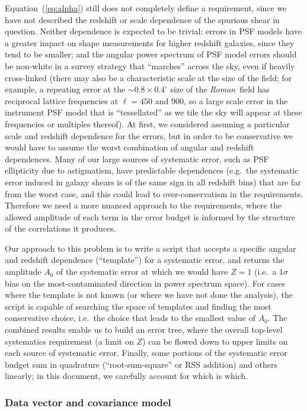 \documentclass[usenatbib]{mnras}
\newcommand{\wfirst}{{\slshape Roman}}
\begin{document}
Equation~(\ref{eq:alpha}) still does not completely define a
requirement, since we have not described the redshift or scale
dependence of the spurious shear in question. Neither dependence is
expected to be trivial: errors in PSF models have a greater impact on
shape measurements for higher redshift galaxies, since they tend to be
smaller; and the angular power spectrum of PSF model errors should be
non-white in a survey strategy that ``marches'' across the sky, even
if heavily cross-linked (there may also be a characteristic scale at
the size of the field; for example, a repeating error at the $\sim
0.8\times0.4^\circ$ size of the \wfirst\ field has reciprocal lattice
frequencies at $\ell = 450$ and 900, so a large scale error in the
instrument PSF model that is ``tessellated'' as we tile the sky will
appear at these frequencies or multiples thereof). At first, we
considered assuming a particular scale and redshift dependence for the
errors, but in order to be conservative we would have to assume the
worst combination of angular and redshift dependences. Many of our
large sources of systematic error, such as PSF ellipticity due to
astigmatism, have predictable dependences (e.g.\ the systematic error
induced in galaxy shears is of the same sign in all redshift bins)
that are far from the worst case, and this could lead to
over-conservatism in the requirements. Therefore we need a more
nuanced approach to the requirements, where the allowed amplitude of
each term in the error budget is informed by the structure of the
correlations it produces.

Our approach to this problem is to write a script that accepts a
specific angular and redshift dependence (``template'') for a
systematic error, and returns the amplitude $A_0$ of the systematic
error at which we would have $Z=1$ (i.e.\ a $1\sigma$ bias on the
most-contaminated direction in power spectrum space). For cases where
the template is not known (or where we have not done the analysis),
the script is capable of searching the space of templates and finding
the most conservative choice, i.e.\ the choice that leads to the
smallest value of $A_0$. The combined results enable us to build an
error tree, where the overall top-level systematics requirement (a
limit on $Z$) can be flowed down to upper limits on each source of
systematic error. Finally, some portions of the systematic error
budget sum in quadrature (``root-sum-square'' or RSS addition) and
others linearly; in this document, we carefully account for which is
which.

\subsubsection{Data vector and covariance model}
\end{document}
